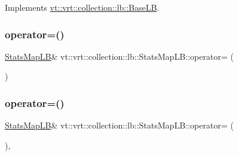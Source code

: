 Implements \hyperlink{structvt_1_1vrt_1_1collection_1_1lb_1_1_base_l_b_a555e29aadfd428383464d6dd007506b6}{vt\+::vrt\+::collection\+::lb\+::\+Base\+LB}.

\mbox{\label{structvt_1_1vrt_1_1collection_1_1lb_1_1_stats_map_l_b_a8cf644da07b97637eb00c5384a59ee1e}} 
\subsubsection{\texorpdfstring{operator=()}{operator=()}\hspace{0.1cm}{\footnotesize\ttfamily [1/2]}}
{\footnotesize\ttfamily \hyperlink{structvt_1_1vrt_1_1collection_1_1lb_1_1_stats_map_l_b}{Stats\+Map\+LB}\& vt\+::vrt\+::collection\+::lb\+::\+Stats\+Map\+L\+B\+::operator= (\begin{DoxyParamCaption}\item[{\hyperlink{structvt_1_1vrt_1_1collection_1_1lb_1_1_stats_map_l_b}{Stats\+Map\+LB} const \&}]{ }\end{DoxyParamCaption})\hspace{0.3cm}{\ttfamily [delete]}}

\mbox{\label{structvt_1_1vrt_1_1collection_1_1lb_1_1_stats_map_l_b_aee5bfc8e45ac47056b8b22128bc0f86e}} 
\subsubsection{\texorpdfstring{operator=()}{operator=()}\hspace{0.1cm}{\footnotesize\ttfamily [2/2]}}
{\footnotesize\ttfamily \hyperlink{structvt_1_1vrt_1_1collection_1_1lb_1_1_stats_map_l_b}{Stats\+Map\+LB}\& vt\+::vrt\+::collection\+::lb\+::\+Stats\+Map\+L\+B\+::operator= (\begin{DoxyParamCaption}\item[{\hyperlink{structvt_1_1vrt_1_1collection_1_1lb_1_1_stats_map_l_b}{Stats\+Map\+LB} \&\&}]{ }\end{DoxyParamCaption})\hspace{0.3cm}{\ttfamily [default]}, {\ttfamily [noexcept]}}

